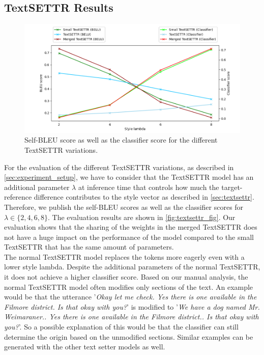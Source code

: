 \documentclass[twocolumn]{tum-article}
\begin{document}
\subsection{TextSETTR Results}
\begin{figure}[!h]
\centering
\includegraphics[width=\textwidth]{figures/eval_plot.png}
\caption{Self-BLEU score as well as the classifier score for the different TextSETTR variations.}
\label{fig:textsettr_fig}
\end{figure}
For the evaluation of the different TextSETTR variations, as described in \autoref{sec:experiment_setup}, we have to consider that the TextSETTR model has an additional parameter $\lambda$ at inference time that controls how much the target-reference difference contributes to the style vector as described in \autoref{sec:textsettr}. Therefore, we publish the self-BLEU scores as well as the classifier scores for $\lambda \in \{2,4,6,8\}$. The evaluation results are shown in \autoref{fig:textsettr_fig}. Our evaluation shows that the sharing of the weights in the merged TextSETTR does not have a huge impact on the performance of the model compared to the small TextSETTR that has the same amount of parameters.\\ 
The normal TextSETTR model replaces the tokens more eagerly even with a lower style lambda. Despite the additional parameters of the normal TextSETTR, it does not achieve a higher classifier score. Based on our manual analysis, the normal TextSETTR model often modifies only sections of the text. An example would be that the utterance '\textit{Okay let me check. Yes there is one available in the Filmore district. Is that okay with you?}' is modified to '\textit{We have a dog named Mr. Weimaraner.. Yes there is one available in the Filmore district.. Is that okay with you?}'. So a possible explanation of this would be that the classifier can still determine the origin based on the unmodified sections. Similar examples can be generated with the other text setter models as well. \\
\end{document}
